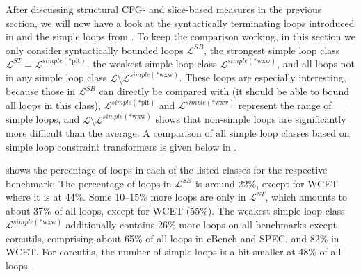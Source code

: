 After discussing structural CFG- and slice-based measures in the previous section, we will now have a look at the syntactically terminating loops introduced in  and the simple loops from . To keep the comparison working, in this section we only consider syntactically bounded loops $\mathcal{L}^{SB}$, the strongest simple loop class $\mathcal{L}^{ST} = \mathcal{L}^{simple(\text{*pit})}$, the weakest simple loop class $\mathcal{L}^{simple(\text{*wxw})}$, and all loops not in any simple loop class $\mathcal{L} \setminus \mathcal{L}^{simple(\text{*wxw})}$. These loops are especially interesting, because those in $\mathcal{L}^{SB}$ can directly be compared with \loopus{} (it should be able to bound all loops in this class), $\mathcal{L}^{simple(\text{*pit})}$ and $\mathcal{L}^{simple(\text{*wxw})}$ represent the range of simple loops, and $\mathcal{L} \setminus \mathcal{L}^{simple(\text{*wxw})}$ shows that non-simple loops are significantly more difficult than the average. A comparison of all simple loop classes based on simple loop constraint transformers is given below in .

 shows the percentage of loops in each of the listed classes for the respective benchmark: The percentage of loops in $\mathcal{L}^{SB}$ is around 22\%, except for WCET where it is at 44\%. Some 10--15\% more loops are only in $\mathcal{L}^{ST}$, which amounts to about 37\% of all loops, except for WCET (55\%). The weakest simple loop class $\mathcal{L}^{simple(\text{*wxw})}$ additionally contains 26\% more loops on all benchmarks except coreutils, comprising about 65\% of all loops in cBench and SPEC, and 82\% in WCET. For coreutils, the number of simple loops is a bit smaller at 48\% of all loops.

